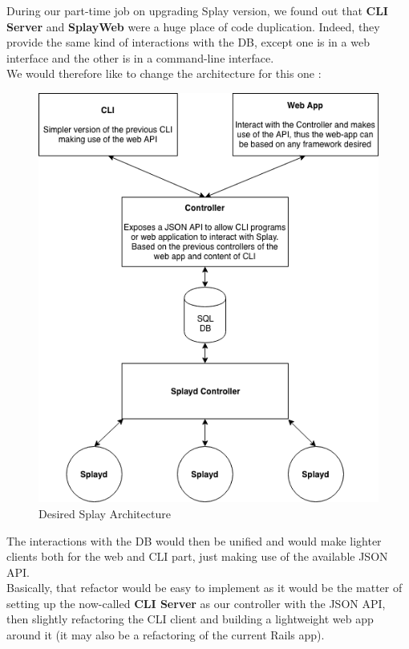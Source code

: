 \documentclass{article}
\begin{document}
  During our part-time job on upgrading Splay version, we found out
  that \textbf{CLI Server} and \textbf{SplayWeb} were a huge place
  of code duplication. Indeed, they provide the same kind of interactions
  with the DB, except one is in a web interface and the other is in a
  command-line interface.\\

  We would therefore like to change the architecture for this one : \\

  \begin{figure}[H]
   \caption{\label{new_arch} Desired Splay Architecture}
   \includegraphics[scale=0.6]{images/new_arch.png}
  \end{figure}

  The interactions with the DB would then be unified and would make
  lighter clients both for the web and CLI part, just making use of
  the available JSON API.\\

  Basically, that refactor would be easy to implement as it would be the
  matter of setting up the now-called \textbf{CLI Server} as our
  controller with the JSON API, then slightly refactoring the CLI client
  and building a lightweight web app around it (it may also be a refactoring
  of the current Rails app).\\
\end{document}
